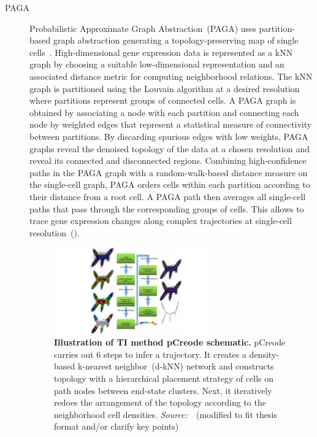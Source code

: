 \begin{description}
  \item[PAGA]
  Probabilistic Approximate Graph Abstraction~(PAGA) uses partition-based graph abstraction generating a topology-preserving map of single cells~\citep{wolf2019paga}. High-dimensional gene expression data is represented as a kNN graph by choosing a suitable low-dimensional representation and an associated distance metric for computing neighborhood relations. The kNN graph is partitioned using the Louvain algorithm at a desired resolution where partitions represent groups of connected cells. A PAGA graph is obtained by associating a node with each partition and connecting each node by weighted edges that represent a statistical measure of connectivity between partitions. By discarding spurious edges with low weights, PAGA graphs reveal the denoised topology of the data at a chosen resolution and reveal its connected and disconnected regions. Combining high-confidence paths in the PAGA graph with a random-walk-based distance measure on the single-cell graph, PAGA orders cells within each partition according to their distance from a root cell. A PAGA path then averages all single-cell paths that pass through the corresponding groups of cells. This allows to trace gene expression changes along complex trajectories at single-cell resolution~().

\begin{figure}[h!]
  	\centering
  	\includegraphics[width=0.65\textwidth]{TI_Alg_pCreode/fig}
  	\vspace{0.1cm}
  	\caption[Illustration of TI method pCreode schematic.]{\textbf{Illustration of TI method pCreode schematic.} pCreode carries out 6 steps to infer a trajectory. It creates a density-based k-nearest neighbor~(d-kNN) network and constructs topology with a hierarchical placement strategy of cells on path nodes between end-state clusters. Next, it iteratively redoes the arrangement of the topology according to the neighborhood cell densities. \emph{Source:~\cite{herring2018pCreode}}~(modified to fit thesis format and/or clarify key points)
  	}
  	\label{fig:TI_Alg_pCreode}
\end{figure}


\end{description}
